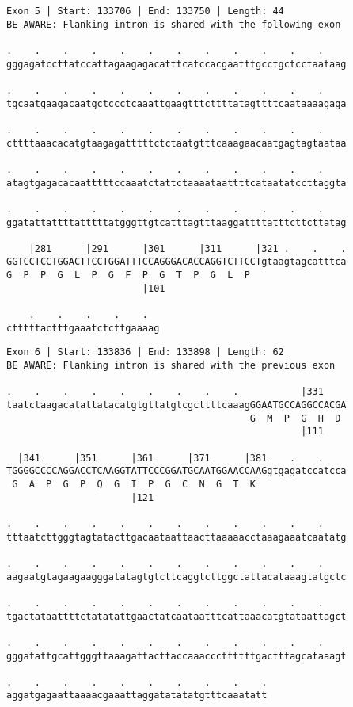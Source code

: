 \documentclass{article}
\begin{document}
\begin{Verbatim}
Exon 5 | Start: 133706 | End: 133750 | Length: 44
BE AWARE: Flanking intron is shared with the following exon
 
.    .    .    .    .    .    .    .    .    .    .    .    
gggagatccttatccattagaagagacatttcatccacgaatttgcctgctcctaataag
  
.    .    .    .    .    .    .    .    .    .    .    .    
tgcaatgaagacaatgctccctcaaattgaagtttcttttatagttttcaataaaagaga
  
.    .    .    .    .    .    .    .    .    .    .    .    
cttttaaacacatgtaagagatttttctctaatgtttcaaagaacaatgagtagtaataa
  
.    .    .    .    .    .    .    .    .    .    .    .    
atagtgagacacaatttttccaaatctattctaaaataattttcataatatccttaggta
  
.    .    .    .    .    .    .    .    .    .    .    .    
ggatattattttatttttatgggttgtcatttagtttaaggattttatttcttcttatag
  
    |281      |291      |301      |311      |321 .    .    .
GGTCCTCCTGGACTTCCTGGATTTCCAGGGACACCAGGTCTTCCTgtaagtagcatttca
G  P  P  G  L  P  G  F  P  G  T  P  G  L  P                 
                        |101                                
  
    .    .    .    .    .  
ctttttactttgaaatctcttgaaaag
\end{Verbatim}
\newpage
\begin{Verbatim}
Exon 6 | Start: 133836 | End: 133898 | Length: 62
BE AWARE: Flanking intron is shared with the previous exon
 
.    .    .    .    .    .    .    .    .           |331    
taatctaagacatattatacatgtgttatgtcgcttttcaaagGGAATGCCAGGCCACGA
                                           G  M  P  G  H  D 
                                                    |111    
  
  |341      |351      |361      |371      |381    .    .    
TGGGGCCCCAGGACCTCAAGGTATTCCCGGATGCAATGGAACCAAGgtgagatccatcca
 G  A  P  G  P  Q  G  I  P  G  C  N  G  T  K                
                      |121                                  
  
.    .    .    .    .    .    .    .    .    .    .    .    
tttaatcttgggtagtatacttgacaataattaacttaaaaacctaaagaaatcaatatg
  
.    .    .    .    .    .    .    .    .    .    .    .    
aagaatgtagaagaagggatatagtgtcttcaggtcttggctattacataaagtatgctc
  
.    .    .    .    .    .    .    .    .    .    .    .    
tgactataattttctatatattgaactatcaataatttcattaaacatgtataattagct
  
.    .    .    .    .    .    .    .    .    .    .    .    
gggatattgcattgggttaaagattacttaccaaacccttttttgactttagcataaagt
  
.    .    .    .    .    .    .    .    .    .
aggatgagaattaaaacgaaattaggatatatatgtttcaaatatt
\end{Verbatim}
\end{document}
